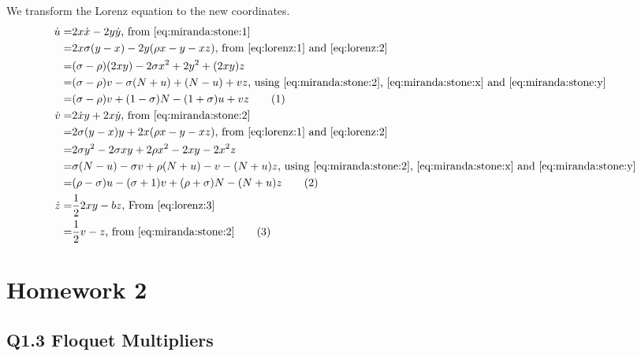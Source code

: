 \documentclass[]{article}
\newcommand\numberthis{\addtocounter{equation}{1}\tag{\theequation}}
\begin{document}
We transform the Lorenz equation to the new coordinates.
\begin{align*}
	\dot{u} =& 2 x \dot{x} - 2 y \dot{y} \text{, from \eqref{eq:miranda:stone:1}}\\
	=& 2x\sigma(y-x)-2y(\rho x - y -xz) \text{, from \eqref{eq:lorenz:1} and \eqref{eq:lorenz:2}}\\
	=&( \sigma - \rho)(2xy) -2\sigma x^2  + 2y^2 + (2xy)z\\
	=& ( \sigma - \rho) v -\sigma (N+u) + (N-u) + vz \text{, using \eqref{eq:miranda:stone:2}, \eqref{eq:miranda:stone:x} and \eqref{eq:miranda:stone:y}}\\ 
	=& ( \sigma - \rho) v + (1-\sigma)N - (1+\sigma)u +vz \numberthis \label{eq:miranda:stone:de:u}\\
	\dot{v} =& 2 \dot{x} y + 2 x \dot{y} \text{, from \eqref{eq:miranda:stone:2}}\\
	=& 2\sigma(y-x)y+2x(\rho x-y-xz)  \text{, from \eqref{eq:lorenz:1} and \eqref{eq:lorenz:2}}\\
	=& 2 \sigma y^2 -2 \sigma x y + 2\rho x^2 -2xy -2 x^2 z\\
	=&  \sigma (N-u) - \sigma v + \rho (N+u) -v - (N+u) z \text{, using \eqref{eq:miranda:stone:2}, \eqref{eq:miranda:stone:x} and \eqref{eq:miranda:stone:y}}\\
	=& (\rho-\sigma) u - (\sigma+1)v + (\rho+\sigma)N - (N+u) z \numberthis \label{eq:miranda:stone:de:v}\\
	\dot{z} =& \frac{1}{2} 2xy - bz \text{, From \eqref{eq:lorenz:3}} \\
	=& \frac{1}{2}v - z \text{, from \eqref{eq:miranda:stone:2}} \numberthis \label{eq:miranda:stone:de:z}
\end{align*}
\section{Homework 2}

\subsection{Q1.3 Floquet Multipliers}
\end{document}

